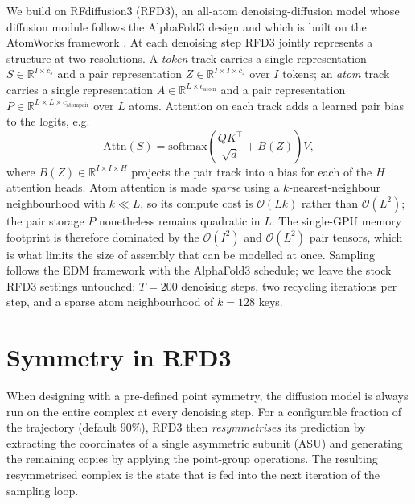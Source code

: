 We build on RFdiffusion3 (RFD3), an all-atom denoising-diffusion model whose
diffusion module follows the AlphaFold3 design
\parencite{butcher_novo_2025,abramsonAccurateStructurePrediction2024} and which is
built on the AtomWorks framework \parencite{corley_accelerating_2025}. At each denoising step RFD3 jointly represents a
structure at two resolutions. A \emph{token} track carries a single
representation $S \in \mathbb{R}^{I \times c_s}$ and a pair representation
$Z \in \mathbb{R}^{I \times I \times c_z}$ over $I$ tokens; an \emph{atom} track
carries a single representation $A \in \mathbb{R}^{L \times c_\text{atom}}$ and a pair representation
$P \in \mathbb{R}^{L \times L \times c_\text{atompair}}$ over $L$ atoms. Attention
on each track adds a learned pair bias to the logits, e.g.
%
\begin{equation}
  \mathrm{Attn}(S) = \mathrm{softmax}\!\left(\frac{QK^\top}{\sqrt{d}} + B(Z)\right)V,
  \label{eq:pair-bias-attn}
\end{equation}
%
where $B(Z) \in \mathbb{R}^{I \times I \times H}$ projects the pair track into a
bias for each of the $H$ attention heads. Atom attention is made \emph{sparse}
using a $k$-nearest-neighbour neighbourhood with $k \ll L$, so its compute cost is
$\mathcal{O}(Lk)$ rather than $\mathcal{O}(L^2)$; the pair storage $P$ nonetheless
remains quadratic in $L$. The single-GPU memory footprint is
therefore dominated by the $\mathcal{O}(I^2)$ and $\mathcal{O}(L^2)$ pair tensors,
which is what limits the size of assembly that can be modelled at once.
Sampling follows the EDM framework \parencite{karras_elucidating_2022} with the
AlphaFold3 schedule; we leave the stock RFD3 settings untouched:
$T=200$ denoising steps, two recycling iterations per step, and a sparse atom
neighbourhood of $k=128$ keys.

\section{Symmetry in RFD3}
\label{sec:rfd3-symmetry}

When designing with a pre-defined point symmetry, the diffusion model is always
run on the entire complex at every denoising step. For a configurable fraction of
the trajectory (default $90\%$), RFD3 then \emph{resymmetrises} its prediction by
extracting the coordinates of a single asymmetric subunit (ASU) and generating the
remaining copies by applying the point-group operations. The resulting
resymmetrised complex is the state that is fed into the next iteration of the
sampling loop.

